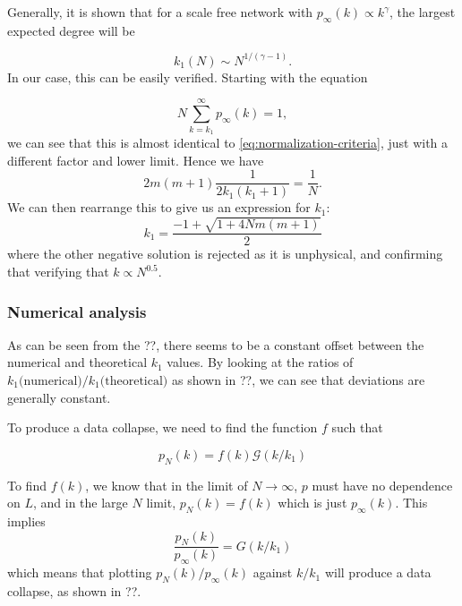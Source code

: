 Generally, it is shown \citep{Boguna2004} that for a scale free network with $p_{\infty}(k) \propto k^{\gamma}$, the largest expected degree will be

\begin{equation}
	k_1(N) \sim N^{1 / (\gamma -1)}.
	\label{eq:largest-expected-degree-research}
\end{equation}
In our case, this can be easily verified. Starting with the equation 

\begin{equation}
	N \sum_{k=k_1}^\infty p_{\infty}(k) = 1, 
	\label{eq:largest-expected-degree-criteria}
\end{equation}
we can see that this is almost identical to \autoref{eq:normalization-criteria}, just with a different factor and lower limit. Hence we have 
\begin{equation}
	2m(m+1) \frac{1}{2k_1(k_1+1)} = \frac{1}{N}.
	\label{eq:largest-expected-degree-derivation}
\end{equation}
We can then rearrange this to give us an expression for $k_1$:
\begin{equation}
	k_1 = \frac{-1 + \sqrt{1 + 4Nm(m+1)}}{2}
	\label{eq:k1-expression}
\end{equation}
where the other negative solution is rejected as it is unphysical, and confirming that verifying that $k \propto N^{0.5}$. 

\subsubsection{Numerical analysis}\label{subsection:pa-numerical-largest-degree}

As can be seen from the ??, there seems to be a constant offset between the numerical and theoretical $k_1$ values. By looking at the ratios of $ k_1 \text{(numerical)} / k_1 \text{(theoretical)} $ as shown in ??, we can see that deviations are generally constant. 

To produce a data collapse, we need to find the function $f$ such that 

\begin{equation}
	p_N(k) = f(k) \mathcal{G}\left ( k / k_1 \right )
	\label{eq:data-collapse}
\end{equation}

To find $f(k)$, we know that in the limit of $N \rightarrow \infty$, $p$ must have no dependence on $L$, and in the large $N$ limit, $p_N(k) = f(k)$ which is just $p_{\infty}(k)$. This implies 
\begin{equation}
	\frac{p_N(k)}{p_{\infty}(k)} = G \left ( k / k_1 \right )
\end{equation}
which means that plotting $p_N(k) / p_{\infty}(k)$ against $k / k_1$ will produce a data collapse, as shown in ??. 
